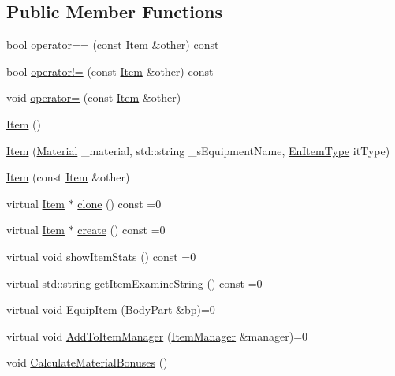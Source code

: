 \subsection*{Public Member Functions}
\begin{DoxyCompactItemize}
\item 
bool \mbox{\hyperlink{class_item_a754d81f7346aebb775b16969a89021b4}{operator==}} (const \mbox{\hyperlink{class_item}{Item}} \&other) const
\item 
bool \mbox{\hyperlink{class_item_a612c595b62d2f7b9c5cd2b085a14b365}{operator!=}} (const \mbox{\hyperlink{class_item}{Item}} \&other) const
\item 
void \mbox{\hyperlink{class_item_a47267a43bfae3f28e183170f45783da5}{operator=}} (const \mbox{\hyperlink{class_item}{Item}} \&other)
\item 
\mbox{\hyperlink{class_item_a297720c02984eab37332ae795d22189d}{Item}} ()
\item 
\mbox{\hyperlink{class_item_a151feb15d24241570c89d776ac31aeb4}{Item}} (\mbox{\hyperlink{class_material}{Material}} \+\_\+material, std\+::string \+\_\+s\+Equipment\+Name, \mbox{\hyperlink{_equipment_8hpp_a3c7fe24829a0b210a1a4d36e29ac01c6}{En\+Item\+Type}} it\+Type)
\item 
\mbox{\hyperlink{class_item_a44f7e3f580bd6c0fa2e1c288dff484be}{Item}} (const \mbox{\hyperlink{class_item}{Item}} \&other)
\item 
virtual \mbox{\hyperlink{class_item}{Item}} $\ast$ \mbox{\hyperlink{class_item_a6d963581e2caad2e08979683a827f39f}{clone}} () const =0
\item 
virtual \mbox{\hyperlink{class_item}{Item}} $\ast$ \mbox{\hyperlink{class_item_a17b3fa0cef44ada961e0d3c65e1de864}{create}} () const =0
\item 
virtual void \mbox{\hyperlink{class_item_aaf7dae41afdce432c11261043e8e4e30}{show\+Item\+Stats}} () const =0
\item 
virtual std\+::string \mbox{\hyperlink{class_item_a00e06647e1adeb62f2d95044476126ac}{get\+Item\+Examine\+String}} () const =0
\item 
virtual void \mbox{\hyperlink{class_item_af4b9caf8fcfc22bbde13bf6c3505b35c}{Equip\+Item}} (\mbox{\hyperlink{class_body_part}{Body\+Part}} \&bp)=0
\item 
virtual void \mbox{\hyperlink{class_item_ae534538f3e77078f804acc742ef68521}{Add\+To\+Item\+Manager}} (\mbox{\hyperlink{class_item_manager}{Item\+Manager}} \&manager)=0
\item 
void \mbox{\hyperlink{class_item_a8f02bc86b6f66142e35a660a5c28ba74}{Calculate\+Material\+Bonuses}} ()

\end{DoxyCompactItemize}
